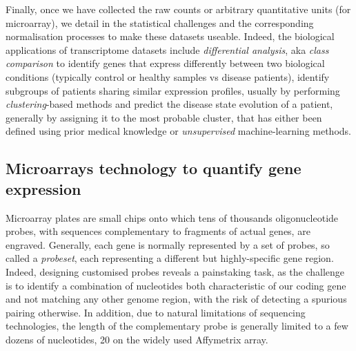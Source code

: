 Finally, once we have collected the raw counts or arbitrary quantitative units (for microarray), we detail in  the statistical challenges and the corresponding normalisation processes to make these datasets useable. Indeed, the biological applications of transcriptome datasets include \textit{differential analysis}, aka \textit{class comparison} to identify genes that express differently between two biological conditions (typically control or healthy samples vs disease patients), identify subgroups of patients sharing similar expression profiles, usually by performing \textit{clustering}-based methods and predict the disease state evolution of a patient, generally by assigning it to the most probable cluster, that has either been defined using prior medical knowledge or \textit{unsupervised} machine-learning methods.

 \subsection{Microarrays technology to quantify gene expression}
\label{subsec:microarray}
Microarray plates are small chips onto which tens of thousands oligonucleotide probes, with sequences complementary to fragments of actual genes, are engraved. Generally, each gene is normally represented by a set of probes, so called a \textit{probeset}, each representing a different but highly-specific gene region. Indeed, designing customised probes reveals a painstaking task, as the challenge is to identify a combination of nucleotides both characteristic of our coding gene and not matching any other genome region, with the risk of detecting a spurious pairing otherwise. In addition, due to natural limitations of sequencing technologies, the length of the complementary probe is generally limited to a few dozens of nucleotides, 20 on the widely used Affymetrix array.  

